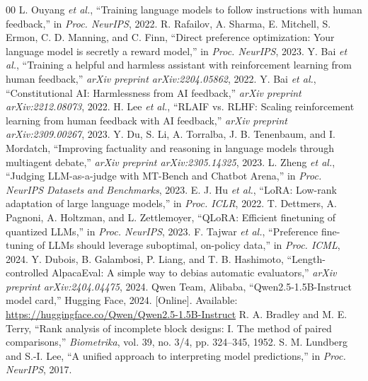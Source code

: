 \documentclass[conference]{IEEEtran}
\begin{document}
\begin{thebibliography}{00}
 L. Ouyang \textit{et al.}, ``Training language
models to follow instructions with human feedback,'' in \textit{Proc. NeurIPS},
2022.
 R. Rafailov, A. Sharma, E. Mitchell, S. Ermon, C. D.
Manning, and C. Finn, ``Direct preference optimization: Your language model is
secretly a reward model,'' in \textit{Proc. NeurIPS}, 2023.
 Y. Bai \textit{et al.}, ``Training a helpful and harmless
assistant with reinforcement learning from human feedback,'' \textit{arXiv
preprint arXiv:2204.05862}, 2022.
 Y. Bai \textit{et al.}, ``Constitutional AI:
Harmlessness from AI feedback,'' \textit{arXiv preprint arXiv:2212.08073}, 2022.
 H. Lee \textit{et al.}, ``RLAIF vs. RLHF: Scaling
reinforcement learning from human feedback with AI feedback,'' \textit{arXiv
preprint arXiv:2309.00267}, 2023.
 Y. Du, S. Li, A. Torralba, J. B. Tenenbaum, and I. Mordatch,
``Improving factuality and reasoning in language models through multiagent
debate,'' \textit{arXiv preprint arXiv:2305.14325}, 2023.
 L. Zheng \textit{et al.}, ``Judging LLM-as-a-judge with
MT-Bench and Chatbot Arena,'' in \textit{Proc. NeurIPS Datasets and Benchmarks},
2023.
 E. J. Hu \textit{et al.}, ``LoRA: Low-rank adaptation of
large language models,'' in \textit{Proc. ICLR}, 2022.
 T. Dettmers, A. Pagnoni, A. Holtzman, and L.
Zettlemoyer, ``QLoRA: Efficient finetuning of quantized LLMs,'' in \textit{Proc.
NeurIPS}, 2023.
 F. Tajwar \textit{et al.}, ``Preference fine-tuning
of LLMs should leverage suboptimal, on-policy data,'' in \textit{Proc. ICML},
2024.
 Y. Dubois, B. Galambosi, P. Liang, and T. B. Hashimoto,
``Length-controlled AlpacaEval: A simple way to debias automatic evaluators,''
\textit{arXiv preprint arXiv:2404.04475}, 2024.
 Qwen Team, Alibaba, ``Qwen2.5-1.5B-Instruct model card,''
Hugging Face, 2024. [Online]. Available:
\url{https://huggingface.co/Qwen/Qwen2.5-1.5B-Instruct}
 R. A. Bradley and M. E. Terry, ``Rank analysis of incomplete
block designs: I. The method of paired comparisons,'' \textit{Biometrika}, vol. 39,
no. 3/4, pp. 324--345, 1952.
 S. M. Lundberg and S.-I. Lee, ``A unified approach to
interpreting model predictions,'' in \textit{Proc. NeurIPS}, 2017.
\end{thebibliography}
\end{document}
